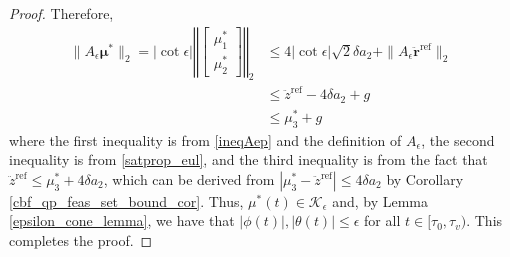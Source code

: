 \documentclass[journal,10pt]{IEEEtran}
\newcommand{\vect}[1]{\boldsymbol{\mathbf{#1}}}
\newcommand{\mat}[1]{\begin{bmatrix} #1 \end{bmatrix}}
\newcommand{\lv}{\left\Vert}
\newcommand{\rv}{\right\Vert}
\newif\ifdraft
\newcommand{\XX}[1]{\ifdraft{\color{red}[{\bf XX}: #1]}\fi}
\newcommand{\VF}[1]{\ifdraft{\color{blue}[{\bf VF}: #1]}\fi}
\begin{document}
\begin{proof}
Therefore,
\begin{align*}
\|A_{\epsilon}\vect{\mu}^*\|_2 =|\cot\epsilon|\lv\mat{\mu^*_1\\\mu^*_2}\rv_2
&\leq 
4|\cot\epsilon|\sqrt{2}\delta a_2+ \|A_{\epsilon}\ddot{\vect{r}}^{\text{ref}}\|_2  \\
&\leq\ddot{z}^{\text{ref}} -4\delta a_2 +g \\
&\leq \mu_3^*+g
\end{align*}
where the first inequality is from \eqref{ineqAep} and the definition of $A_{\epsilon}$, the second inequality is from \eqref{satprop_eul}, and the third inequality is from the fact that $\ddot{z}^{\text{ref}} \leq \mu_3^*+4\delta a_2$, which can be derived from  $|\mu_3^* - \ddot{z}^{\text{ref}}|\leq 4\delta a_2$ by Corollary \ref{cbf_qp_feas_set_bound_cor}. 
Thus, $\mu^*(t)\in\mathcal{K}_{\epsilon}$ and, by Lemma \ref{epsilon_cone_lemma}, 
we have that $|\phi(t)|,|\theta(t)|\leq \epsilon$ for all $t\in[\tau_0,\tau_v)$. This completes the proof.
\end{proof}
\end{document}
